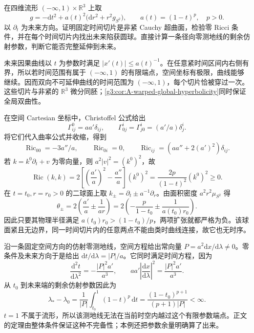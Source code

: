 \begin{exercise}\label{g3:ex:A-contracting-power-model}
	在四维流形 \(( -\infty,1)\times\mathbb R^3\) 上取
	\[
		g=-\mathrm dt^2+a(t)^2\bigl(\mathrm dr^2+r^2g_{S^2}\bigr),
		\qquad a(t)=(1-t)^p,\quad p>0.
	\]
	以 \(\partial_t\) 为未来方向。证明固定时间切片是非紧 Cauchy 超曲面，检验零 Ricci 条件，并在每个时间切片内找出未来陷获圆球。直接计算一条径向零测地线的剩余仿射参数，判断它能否完整延伸到未来。
\end{exercise}
\begin{solution}
	未来因果曲线以 \(t\) 为参数时满足 \(|x'(t)|\le a(t)^{-1}\)。在任意紧时间区间内右侧有界，所以若时间范围有属于 \((-\infty,1)\) 的有限端点，空间坐标有极限，曲线能够继续。因而双向不可延伸曲线的时间范围为 \((-\infty,1)\)，每个切片恰被穿过一次。这些切片与非紧的 \(\mathbb R^3\) 微分同胚；\cref{g3:cor:A-warped-global-hyperbolicity}同时保证全局双曲性。

	在空间 Cartesian 坐标中，Christoffel 公式给出
	\[
		\Gamma^0_{ij}=aa'\delta_{ij},\qquad
		\Gamma^i_{0j}=\Gamma^i_{j0}=(a'/a)\delta^i_j.
	\]
	将它们代入曲率公式并收缩，得到
	\[
		\operatorname{Ric}_{00}=-3a''/a,\qquad
		\operatorname{Ric}_{0i}=0,\qquad
		\operatorname{Ric}_{ij}=(aa''+2(a')^2)\delta_{ij}.
	\]
	若 \(k=k^0\partial_t+v\) 为零向量，则 \(a^2|v|^2=(k^0)^2\)，故
	\[
		\operatorname{Ric}(k,k)
		=2\left[\left(\frac{a'}a\right)^2-\frac{a''}a\right](k^0)^2
		=\frac{2p}{(1-t)^2}(k^0)^2\ge0.
	\]
	在 \(t=t_0,r=r_0>0\) 的二球面上取 \(k_\pm=\partial_t\pm a^{-1}\partial_r\)。由面积密度 \(a^2r^2\mu_{S^2}\) 得
	\[
		\theta_\pm=2\left(\frac{a'}a\pm\frac1{ar}\right)
		=2\left(-\frac{p}{1-t_0}\pm\frac1{a(t_0)r_0}\right).
	\]
	因此只要其物理半径满足 \(a(t_0)r_0>(1-t_0)/p\)，两项扩张就都严格为负。该球面紧且无边界，同一时间切片内的任意两点不能由类时曲线连接，故它也无时序。

	沿一条固定空间方向的仿射零测地线，空间方程给出常向量 \(P=a^2\mathrm dx/\mathrm d\lambda\ne0\)。零条件及未来方向于是给出 \(\mathrm dt/\mathrm d\lambda=|P|/a\)。它同时满足时间方程，因为
	\[
		\frac{\mathrm d^2t}{\mathrm d\lambda^2}
		=-\frac{|P|^2a'}{a^3},\qquad
		aa'\left|\frac{\mathrm dx}{\mathrm d\lambda}\right|^2
		=\frac{|P|^2a'}{a^3}.
	\]
	从 \(t_0\) 到未来端的剩余仿射参数因此为
	\[
		\lambda_*-\lambda_0
		=\frac1{|P|}\int_{t_0}^1(1-t)^p\,\mathrm dt
		=\frac{(1-t_0)^{p+1}}{(p+1)|P|}<\infty.
	\]
	\(t=1\) 不属于流形，所以该测地线无法在当前时空内越过这个有限参数端点。正文的定理由整体条件保证这种不完备性；本例还把参数余量明确算了出来。
\end{solution}

